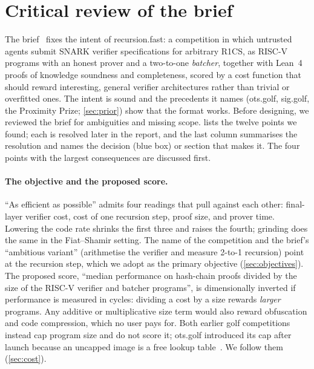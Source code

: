 \section{Critical review of the brief}\label{sec:brief-review}

The brief~\cite{recursionfastbrief} fixes the intent of recursion.fast: a competition in which
untrusted agents submit SNARK verifier specifications for arbitrary R1CS, as RISC-V programs with an
honest prover and a two-to-one \emph{batcher}, together with Lean~4 proofs of knowledge soundness and
completeness, scored by a cost function that should reward interesting, general verifier architectures
rather than trivial or overfitted ones. The intent is sound and the precedents it names (ots.golf,
sig.golf, the Proximity Prize; \cref{sec:prior}) show that the format works. Before designing, we
reviewed the brief for ambiguities and missing scope.  lists the twelve points
we found; each is resolved later in the report, and the last column summarises the resolution and
names the decision (blue box) or section that makes it. The four points with the largest
consequences are discussed first.

\paragraph{The objective and the proposed score.} \enquote{As efficient as possible} admits four
readings that pull against each other: final-layer verifier cost, cost of one recursion step, proof
size, and prover time. Lowering the code rate shrinks the first three and raises the fourth; grinding
does the same in the Fiat--Shamir setting. The name of the competition and the brief's
\enquote{ambitious variant} (arithmetise the verifier and measure 2-to-1 recursion) point at the
recursion step, which we adopt as the primary objective (\cref{sec:objectives}). The proposed score,
\enquote{median performance on hash-chain proofs divided by the size of the RISC-V verifier and
batcher programs}, is dimensionally inverted if performance is measured in cycles: dividing a cost by
a size rewards \emph{larger} programs. Any additive or multiplicative size term would also reward
obfuscation and code compression, which no user pays for. Both earlier golf competitions instead cap
program size and do not score it; ots.golf introduced its cap after launch because an uncapped image
is a free lookup table~\cite{otsgolf2026}. We follow them (\cref{sec:cost}).

